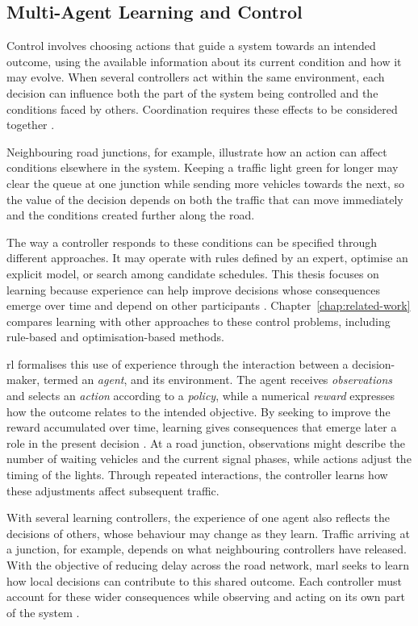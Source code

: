 \subsection{Multi-Agent Learning and Control}
\label{sec:intro-marl}

Control involves choosing actions that guide a system towards an intended outcome, using the available information about its current condition and how it may evolve. When several controllers act within the same environment, each decision can influence both the part of the system being controlled and the conditions faced by others. Coordination requires these effects to be considered together \parencite{albrecht2024marl}.

Neighbouring road junctions, for example, illustrate how an action can affect conditions elsewhere in the system. Keeping a traffic light green for longer may clear the queue at one junction while sending more vehicles towards the next, so the value of the decision depends on both the traffic that can move immediately and the conditions created further along the road.

The way a controller responds to these conditions can be specified through different approaches. It may operate with rules defined by an expert, optimise an explicit model, or search among candidate schedules. This thesis focuses on learning because experience can help improve decisions whose consequences emerge over time and depend on other participants \parencite{sutton2018rl,albrecht2024marl}. Chapter~\ref{chap:related-work} compares learning with other approaches to these control problems, including rule-based and optimisation-based methods.

\gls{rl} formalises this use of experience through the interaction between a decision-maker, termed an \emph{agent}, and its environment. The agent receives \emph{observations} and selects an \emph{action} according to a \emph{policy}, while a numerical \emph{reward} expresses how the outcome relates to the intended objective. By seeking to improve the reward accumulated over time, learning gives consequences that emerge later a role in the present decision \parencite{sutton2018rl}. At a road junction, observations might describe the number of waiting vehicles and the current signal phases, while actions adjust the timing of the lights. Through repeated interactions, the controller learns how these adjustments affect subsequent traffic.

With several learning controllers, the experience of one agent also reflects the decisions of others, whose behaviour may change as they learn. Traffic arriving at a junction, for example, depends on what neighbouring controllers have released. With the objective of reducing delay across the road network, \gls{marl} seeks to learn how local decisions can contribute to this shared outcome. Each controller must account for these wider consequences while observing and acting on its own part of the system \parencite{gronauer2022survey,albrecht2024marl}.

